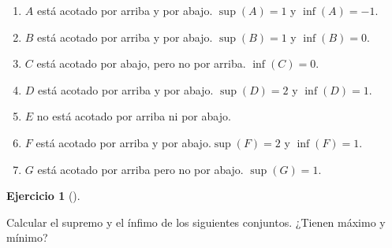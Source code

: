 \documentclass[
  a4paper,
]{scrreport}
\theoremstyle{definition}
\newtheorem{exercise}{Ejercicio}[chapter]
\theoremstyle{remark}
\begin{document}
\begin{tcolorbox}
\begin{tcolorbox}
\begin{tcolorbox}
\begin{tcolorbox}
\begin{tcolorbox}
\begin{tcolorbox}
\begin{tcolorbox}
\begin{tcolorbox}
\begin{tcolorbox}
\begin{tcolorbox}
\begin{tcolorbox}
\begin{tcolorbox}
\begin{tcolorbox}
\begin{tcolorbox}
\begin{tcolorbox}
\begin{tcolorbox}
\begin{tcolorbox}
\begin{tcolorbox}
\begin{tcolorbox}
\begin{tcolorbox}
\begin{tcolorbox}
\begin{tcolorbox}
\begin{tcolorbox}
\begin{tcolorbox}
\begin{tcolorbox}
\begin{tcolorbox}
\begin{tcolorbox}
\begin{tcolorbox}
\begin{tcolorbox}
\begin{tcolorbox}
\begin{tcolorbox}
\begin{tcolorbox}
\begin{tcolorbox}
\begin{tcolorbox}
\begin{tcolorbox}
\begin{tcolorbox}
\begin{tcolorbox}
\begin{tcolorbox}
\begin{tcolorbox}
\begin{tcolorbox}
\begin{tcolorbox}
\begin{tcolorbox}
\begin{tcolorbox}
\begin{tcolorbox}
\begin{tcolorbox}
\begin{tcolorbox}
\begin{tcolorbox}
\begin{tcolorbox}
\begin{tcolorbox}
\begin{tcolorbox}
\begin{tcolorbox}
\begin{enumerate}
\def\labelenumi{\alph{enumi}.}
\item
  \(A\) está acotado por arriba y por abajo. \(\sup(A)=1\) y
  \(\inf(A)=-1\).
\item
  \(B\) está acotado por arriba y por abajo. \(\sup(B)=1\) y
  \(\inf(B)=0\).
\item
  \(C\) está acotado por abajo, pero no por arriba. \(\inf(C)=0\).
\item
  \(D\) está acotado por arriba y por abajo. \(\sup(D)=2\) y
  \(\inf(D)=1\).
\item
  \(E\) no está acotado por arriba ni por abajo.
\item
  \(F\) está acotado por arriba y por abajo.\(\sup(F)=2\) y
  \(\inf(F)=1\).
\item
  \(G\) está acotado por arriba pero no por abajo. \(\sup(G)=1\).
\end{enumerate}

\end{tcolorbox}

\begin{exercise}[]\protect\hypertarget{exr-supremo-infimo-maximo-minimo-2}{}\label{exr-supremo-infimo-maximo-minimo-2}

Calcular el supremo y el ínfimo de los siguientes conjuntos. ¿Tienen
máximo y mínimo?


\end{exercise}
\end{tcolorbox}
\end{tcolorbox}
\end{tcolorbox}
\end{tcolorbox}
\end{tcolorbox}
\end{tcolorbox}
\end{tcolorbox}
\end{tcolorbox}
\end{tcolorbox}
\end{tcolorbox}
\end{tcolorbox}
\end{tcolorbox}
\end{tcolorbox}
\end{tcolorbox}
\end{tcolorbox}
\end{tcolorbox}
\end{tcolorbox}
\end{tcolorbox}
\end{tcolorbox}
\end{tcolorbox}
\end{tcolorbox}
\end{tcolorbox}
\end{tcolorbox}
\end{tcolorbox}
\end{tcolorbox}
\end{tcolorbox}
\end{tcolorbox}
\end{tcolorbox}
\end{tcolorbox}
\end{tcolorbox}
\end{tcolorbox}
\end{tcolorbox}
\end{tcolorbox}
\end{tcolorbox}
\end{tcolorbox}
\end{tcolorbox}
\end{tcolorbox}
\end{tcolorbox}
\end{tcolorbox}
\end{tcolorbox}
\end{tcolorbox}
\end{tcolorbox}
\end{tcolorbox}
\end{tcolorbox}
\end{tcolorbox}
\end{tcolorbox}
\end{tcolorbox}
\end{tcolorbox}
\end{tcolorbox}
\end{tcolorbox}
\end{document}
